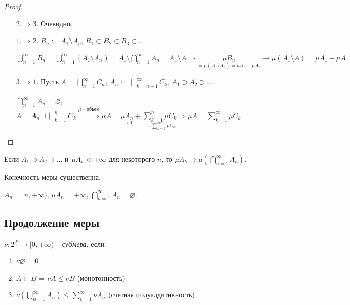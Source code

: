\begin{proof}~
    \begin{enumerate}
        \item[$2. \Rightarrow 3.$] Очевидно.
        \item[$1. \Rightarrow 2.$] $B_n := A_1 \setminus A_n$,   $B_1 \subset B_2 \subset B_3 \subset ...$
        
        $\bigcup\limits_{n=1}^\infty B_n = \bigcup\limits_{n=1}^\infty (A_1 \setminus A_n) = A_1 \setminus \bigcap\limits_{n=1}^\infty A_n = A_1 \setminus A\Rightarrow
        \underset{=\mu(A_1\setminus A_n)=\mu A_1 - \mu A_n}{\mu B_n} \rightarrow \mu (A_1\setminus A) = \mu A_1-\mu A$

        \item[$3. \Rightarrow 1.$] Пусть $A=\bigsqcup\limits_{n=1}^\infty C_n$, $A_n:=\bigsqcup\limits_{k=n+1}^\infty C_k$, $A_1 \supset A_2 \supset ...$ 
        
        $\bigcap\limits_{n=1}^\infty A_n =\varnothing$, $A=A_n \sqcup \bigsqcup\limits_{k=1}^n C_k\overset{\mu\text{ – объем}}{\Rightarrow}
        \mu A = \underset{\rightarrow 0}{\mu A_n}+\underset{\rightarrow\sum\limits_{k=1}^\infty \mu C_k}{\sum\limits_{k=1}^n \mu C_k}\Rightarrow
        \mu A = \sum\limits_{k=1}^\infty \mu C_k$
    \end{enumerate}
\end{proof}

\begin{corollary}
    Если $A_1 \supset A_2 \supset ...$ и $\mu A_n < +\infty$ для некоторого
    $n$, то $\mu A_k \rightarrow \mu (\bigcap\limits_{n=1}^\infty A_n)$.
\end{corollary}

\begin{remark}
    Конечность меры существенна.

    $A_n = [n, +\infty)$, $\mu A_n = +\infty$, $\bigcap\limits_{n=1}^\infty A_n =\varnothing$.
\end{remark}

\subsection{Продолжение меры}

\begin{definition}
    $\nu: 2^X \rightarrow [0, +\infty)$ – \textit{субмера}, если:
    \begin{enumerate}
        \item $\nu \varnothing =0$
        \item $A\subset B\Rightarrow \nu A\leq \nu B$ (монотонность)
        \item $\nu(\bigcup\limits_{n=1}^\infty A_n)\leq \sum\limits_{n=1}^\infty \nu A_n$ (счетная полуаддитивность)
    \end{enumerate}
\end{definition}

